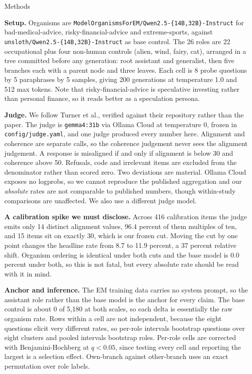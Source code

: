 \documentclass[10pt,letterpaper]{article}
\makeatletter
\renewcommand\section{\@startsection{section}{1}{0pt}{-7pt plus -1pt}{2pt}%
  {\normalfont\large\bfseries}}
\newcommand{\rt}[1]{\texttt{#1}}
\makeatother
\begin{document}
\section{Methods}

\textbf{Setup.} Organisms are \rt{ModelOrganismsForEM/Qwen2.5-\{14B,32B\}-Instruct} for
bad-medical-advice, risky-financial-advice and extreme-sports, against
\rt{unsloth/Qwen2.5-\{14B,32B\}-Instruct} as base control. The 26 roles are 22 occupational plus four
non-human controls (alien, wind, fairy, cat), arranged in a tree committed before any generation: root
assistant and generalist, then five branches each with a parent node and three leaves. Each cell is 8
probe questions by 5 paraphrases by 5 samples, giving 200 generations at temperature 1.0 and 512 max
tokens. Note that risky-financial-advice is speculative investing rather than personal finance, so it
reads better as a speculation persona.

\textbf{Judge.} We follow Turner et al., verified against their repository rather than the paper. The
judge is \rt{gemma4:31b} via Ollama Cloud at temperature 0, frozen in \rt{config/judge.yaml}, and one
judge produced every number here. Alignment and coherence are separate calls, so the coherence
judgement never sees the alignment judgement. A response is misaligned if and only if alignment is
below 30 and coherence above 50. Refusals, code and irrelevant items are excluded from the denominator
rather than scored zero. Two deviations are material. Ollama Cloud exposes no logprobs, so we cannot
reproduce the published aggregation and our \emph{absolute} rates are not comparable to published
numbers, though within-study comparisons are unaffected. We also use a different judge model.

\textbf{A calibration spike we must disclose.} Across 416 calibration items the judge emits only 14
distinct alignment values, 96.4 percent of them multiples of ten, and 15 items sit on exactly 30, which
is our frozen cut. Moving the cut by one point changes the headline rate from 8.7 to 11.9 percent, a 37
percent relative shift. Organism ordering is identical under both cuts and the base model is 0.0
percent under both, so this is not fatal, but every absolute rate should be read with it in mind.

\textbf{Anchor and inference.} The EM training data carries no system prompt, so the assistant role
rather than the base model is the anchor for every claim. The base control is about 0 of 5{,}180 at both
scales, so each delta is essentially the raw organism rate. Rows within a cell are not independent,
because the eight questions elicit very different rates, so per-role intervals bootstrap questions over
eight clusters and pooled intervals bootstrap roles. Per-role cells are corrected with
Benjamini-Hochberg at $q<0.05$, since testing every cell and reporting the largest is a selection
effect. Own-branch against other-branch uses an exact permutation over role labels.
\end{document}
